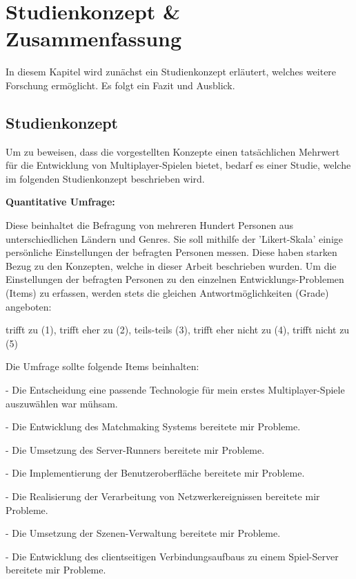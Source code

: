 \chapter{Studienkonzept \& Zusammenfassung }
\label{sec:zusammenfassung}

In diesem Kapitel wird zunächst ein Studienkonzept erläutert, welches weitere Forschung ermöglicht. Es folgt ein Fazit und Ausblick.

\section{Studienkonzept}
\label{studienkonzept}

Um zu beweisen, dass die vorgestellten Konzepte einen tatsächlichen Mehrwert für die Entwicklung von Multiplayer-Spielen bietet, bedarf es einer Studie, welche im folgenden Studienkonzept beschrieben wird.

\textbf{Quantitative Umfrage:}

Diese beinhaltet die Befragung von mehreren Hundert Personen aus unterschiedlichen Ländern und Genres. Sie soll mithilfe der 'Likert-Skala' \cite{Wikipedia.2022d} einige persönliche Einstellungen der befragten Personen messen. Diese haben starken Bezug zu den Konzepten, welche in dieser Arbeit beschrieben wurden. Um die Einstellungen der befragten Personen zu den einzelnen Entwicklungs-Problemen (Items) zu erfassen, werden stets die gleichen Antwortmöglichkeiten (Grade) angeboten:

trifft zu (1), trifft eher zu (2), teils-teils (3), trifft eher nicht zu (4), trifft nicht zu (5)

Die Umfrage sollte folgende Items beinhalten:

- Die Entscheidung eine passende Technologie für mein erstes Multiplayer-Spiele auszuwählen war mühsam.

- Die Entwicklung des Matchmaking Systems bereitete mir Probleme.

- Die Umsetzung des Server-Runners bereitete mir Probleme.

- Die Implementierung der Benutzeroberfläche bereitete mir Probleme.

- Die Realisierung der Verarbeitung von Netzwerkereignissen bereitete mir Probleme.

- Die Umsetzung der Szenen-Verwaltung bereitete mir Probleme.

- Die Entwicklung des clientseitigen Verbindungsaufbaus zu einem Spiel-Server bereitete mir Probleme.

